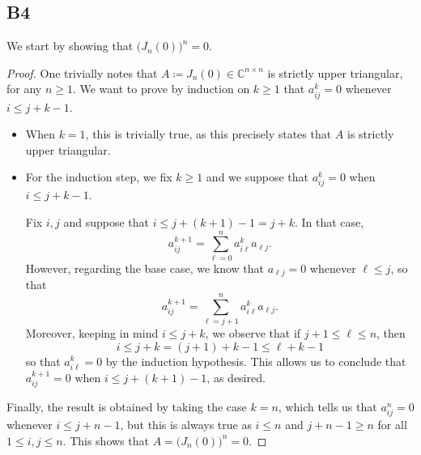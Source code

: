 \documentclass[11pt]{article}
\newcommand{\complex}{\mathbb{C}} %
\begin{document}
\subsection*{B4}
We start by showing that \(\big(J_n(0)\big)^n=0\).
\begin{proof}
One trivially notes that \(A \coloneqq J_n(0) \in \complex^{n \times n}\) is strictly upper triangular, for any \(n \geqslant 1\).
We want to prove by induction on \(k \geqslant 1\) that \(a_{ij}^k = 0\) whenever \(i \leqslant j + k - 1\).

\begin{itemize}
\item When \(k = 1\), this is trivially true, as this precisely states that \(A\) is strictly upper triangular.

\item For the induction step, we fix \(k \geqslant 1\) and we suppose that \(a_{ij}^k = 0\) when \(i \leqslant j + k - 1\).

Fix \(i, j\) and suppose that \(i \leqslant j + (k + 1) - 1 = j + k \).
In that case,
\[
a_{ij}^{k+1} = \sum_{\ell = 0}^n a_{i \ell}^k a_{\ell j}.
\]
However, regarding the base case, we know that \(a_{\ell j} = 0\) whenever \(\ell \leqslant j\), so that
\[
a_{ij}^{k+1} = \sum_{\ell = j + 1}^n a_{i \ell}^k a_{\ell j}.
\]
Moreover, keeping in mind \(i \leqslant j + k \), we observe that if \(j+1 \leqslant \ell \leqslant n\), then
\[
i \leqslant j + k = (j + 1) + k - 1 \leqslant \ell + k - 1
\]
so that \(a_{i \ell}^k = 0\) by the induction hypothesis.
This allows us to conclude that \(a_{ij}^{k+1} = 0\) when \(i \leqslant j + (k+1) -1 \), as desired.
\end{itemize}
Finally, the result is obtained by taking the case \(k = n\), which tells us that \(a_{ij}^n = 0\) whenever \(i \leqslant j + n - 1\), but this is always true as \(i \leqslant n\) and \(j + n - 1 \geqslant n\) for all \(1 \leqslant i, j \leqslant n\).
This shows that \(A = \Big(J_n(0)\Big)^n = 0\).
\end{proof}
\end{document}
